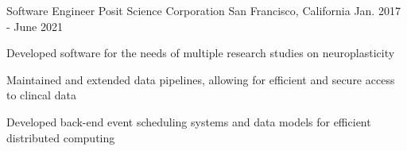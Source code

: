 \documentclass[../omelveny-cv]{subfiles}
\begin{document}
\begin{cventries}
    \cventry
    {Software Engineer}
    {Posit Science Corporation}
    {San Francisco, California}
    {Jan. 2017 - June 2021}
    {
        \begin{cvitems}
            \item {Developed software for the needs of multiple research studies on neuroplasticity}
            \item {Maintained and extended data pipelines, allowing for efficient and secure access to clincal data}
            \item {Developed back-end event scheduling systems and data models for efficient distributed computing}
        \end{cvitems}
    }


\end{cventries}
\end{document}
